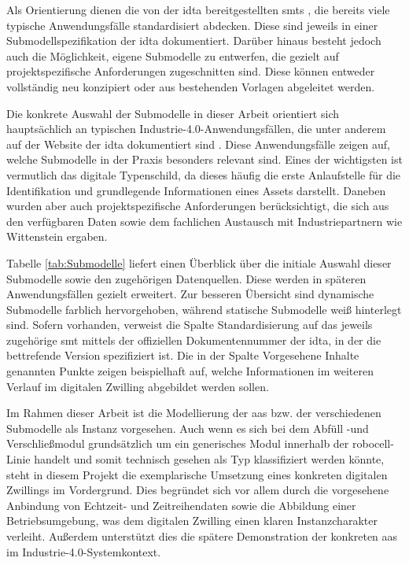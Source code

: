 Als Orientierung dienen die von der \acs{idta} bereitgestellten \acsp{smt} \cite{idtaTemplates}, die bereits viele typische Anwendungsfälle standardisiert abdecken.
Diese sind jeweils in einer Submodellspezifikation der \acs{idta} dokumentiert.
Darüber hinaus besteht jedoch auch die Möglichkeit, eigene Submodelle zu entwerfen, die gezielt auf projektspezifische Anforderungen zugeschnitten sind.
Diese können entweder vollständig neu konzipiert oder aus bestehenden Vorlagen abgeleitet werden.

Die konkrete Auswahl der Submodelle in dieser Arbeit orientiert sich hauptsächlich an typischen Industrie-4.0-Anwendungsfällen, die unter anderem auf der Website der \acs{idta} dokumentiert sind \cite{idtaUseCases}.
Diese Anwendungsfälle zeigen auf, welche Submodelle in der Praxis besonders relevant sind.
Eines der wichtigsten ist vermutlich das digitale Typenschild, da dieses häufig die erste Anlaufstelle für die Identifikation und grundlegende Informationen eines Assets darstellt.
Daneben wurden aber auch projektspezifische Anforderungen berücksichtigt, die sich aus den verfügbaren Daten sowie dem fachlichen Austausch mit Industriepartnern wie Wittenstein ergaben.

Tabelle \ref{tab:Submodelle} liefert einen Überblick über die initiale Auswahl dieser Submodelle sowie den zugehörigen Datenquellen.
Diese werden in späteren Anwendungsfällen gezielt erweitert.
Zur besseren Übersicht sind dynamische Submodelle farblich hervorgehoben, während statische Submodelle weiß hinterlegt sind.
Sofern vorhanden, verweist die Spalte Standardisierung auf das jeweils zugehörige \acs{smt} mittels der offiziellen Dokumentennummer der \acs{idta}, in der die bettrefende Version spezifiziert ist.
Die in der Spalte Vorgesehene Inhalte genannten Punkte zeigen beispielhaft auf, welche Informationen im weiteren Verlauf im digitalen Zwilling abgebildet werden sollen.



Im Rahmen dieser Arbeit ist die Modellierung der \acs{aas} bzw. der verschiedenen Submodelle als Instanz vorgesehen.
Auch wenn es sich bei dem Abfüll -und Verschließmodul grundsätzlich um ein generisches Modul innerhalb der robocell-Linie handelt und somit technisch gesehen als Typ klassifiziert werden könnte, steht in diesem Projekt die exemplarische Umsetzung eines konkreten digitalen Zwillings im Vordergrund.
Dies begründet sich vor allem durch die vorgesehene Anbindung von Echtzeit- und Zeitreihendaten sowie die Abbildung einer Betriebsumgebung, was dem digitalen Zwilling einen klaren Instanzcharakter verleiht.
Außerdem unterstützt dies die spätere Demonstration der konkreten \acs{aas} im Industrie-4.0-Systemkontext.


